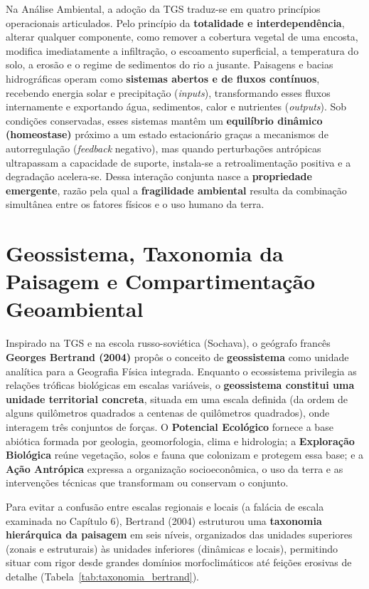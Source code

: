 Na Análise Ambiental, a adoção da TGS traduz-se em quatro princípios operacionais articulados. Pelo princípio da \textbf{totalidade e interdependência}, alterar qualquer componente, como remover a cobertura vegetal de uma encosta, modifica imediatamente a infiltração, o escoamento superficial, a temperatura do solo, a erosão e o regime de sedimentos do rio a jusante. Paisagens e bacias hidrográficas operam como \textbf{sistemas abertos e de fluxos contínuos}, recebendo energia solar e precipitação (\textit{inputs}), transformando esses fluxos internamente e exportando água, sedimentos, calor e nutrientes (\textit{outputs}). Sob condições conservadas, esses sistemas mantêm um \textbf{equilíbrio dinâmico (homeostase)} próximo a um estado estacionário graças a mecanismos de autorregulação (\textit{feedback} negativo), mas quando perturbações antrópicas ultrapassam a capacidade de suporte, instala-se a retroalimentação positiva e a degradação acelera-se. Dessa interação conjunta nasce a \textbf{propriedade emergente}, razão pela qual a \textbf{fragilidade ambiental} resulta da combinação simultânea entre os fatores físicos e o uso humano da terra.

\section{Geossistema, Taxonomia da Paisagem e Compartimentação Geoambiental}

Inspirado na TGS e na escola russo-soviética (Sochava), o geógrafo francês \textbf{Georges Bertrand (2004)} propôs o conceito de \textbf{geossistema} como unidade analítica para a Geografia Física integrada. Enquanto o ecossistema privilegia as relações tróficas biológicas em escalas variáveis, o \textbf{geossistema constitui uma unidade territorial concreta}, situada em uma escala definida (da ordem de alguns quilômetros quadrados a centenas de quilômetros quadrados), onde interagem três conjuntos de forças. O \textbf{Potencial Ecológico} fornece a base abiótica formada por geologia, geomorfologia, clima e hidrologia; a \textbf{Exploração Biológica} reúne vegetação, solos e fauna que colonizam e protegem essa base; e a \textbf{Ação Antrópica} expressa a organização socioeconômica, o uso da terra e as intervenções técnicas que transformam ou conservam o conjunto.

Para evitar a confusão entre escalas regionais e locais (a falácia de escala examinada no Capítulo 6), Bertrand (2004) estruturou uma \textbf{taxonomia hierárquica da paisagem} em seis níveis, organizados das unidades superiores (zonais e estruturais) às unidades inferiores (dinâmicas e locais), permitindo situar com rigor desde grandes domínios morfoclimáticos até feições erosivas de detalhe (Tabela~\ref{tab:taxonomia_bertrand}).

